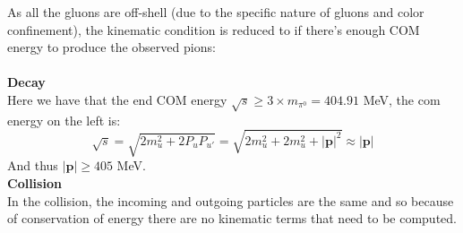 \documentclass[10pt,a4paper,twoside]{article}
\begin{document}
As all the gluons are off-shell (due to the specific nature of gluons and color confinement), the kinematic condition is reduced to if there's enough COM energy to produce the observed pions:
\\\\
\textbf{Decay}\\
Here we have that the end COM energy $\sqrt{s}\geq 3\times m_{\pi^0} = 404.91$ MeV, the com energy on the left is:
\begin{equation}
	\sqrt{s} = \sqrt{2m_u^2 + 2P_uP_{u'}} = \sqrt{2m_u^2 + 2m_u^2 + |\boldsymbol{p}|^2} \approx |\boldsymbol{p}|
\end{equation}
And thus $|\boldsymbol{p}| \geq 405$ MeV. 
\\
\textbf{Collision}
\\In the collision, the incoming and outgoing particles are the same and so because of conservation of energy there are no kinematic terms that need to be computed.


\end{document}
